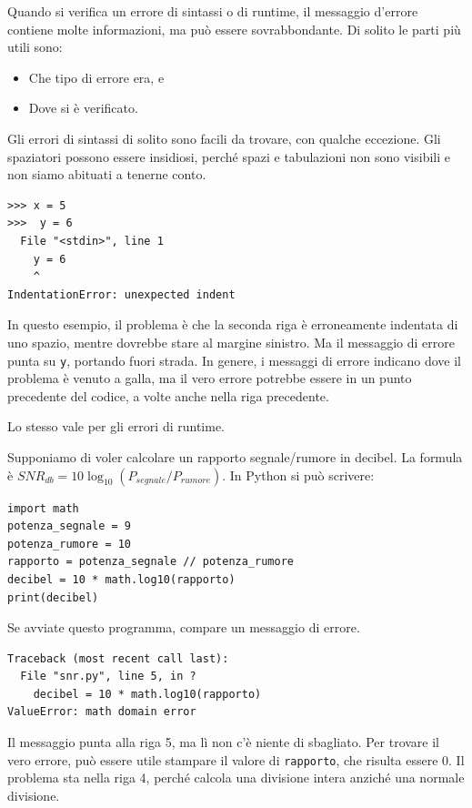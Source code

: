 \documentclass[10pt]{book}
\begin{document}
Quando si verifica un errore di sintassi o di runtime, il messaggio d'errore  contiene molte informazioni, ma può essere sovrabbondante. Di solito le parti più utili sono:

\begin{itemize}

\item Che tipo di errore era, e

\item Dove si è verificato.

\end{itemize}

Gli errori di sintassi di solito sono facili da trovare, con qualche eccezione. Gli spaziatori possono essere insidiosi, perché spazi e tabulazioni non sono visibili e non siamo abituati a tenerne conto.

\begin{verbatim}
>>> x = 5
>>>  y = 6
  File "<stdin>", line 1
    y = 6
    ^
IndentationError: unexpected indent
\end{verbatim}
%
In questo esempio, il problema è che la seconda riga è erroneamente indentata di uno spazio, mentre dovrebbe stare al margine sinistro. Ma il messaggio di errore punta su {\tt y}, portando fuori strada. In genere, i messaggi di errore indicano dove il problema è venuto a galla, ma il vero errore potrebbe essere in un punto precedente del codice, a volte anche nella riga precedente.


Lo stesso vale per gli errori di runtime. 

Supponiamo di voler calcolare un rapporto segnale/rumore in decibel. La formula è
 $SNR_{db} = 10 \log_{10} (P_{segnale} / P_{rumore})$. In Python si può scrivere:

\begin{verbatim}
import math
potenza_segnale = 9
potenza_rumore = 10
rapporto = potenza_segnale // potenza_rumore
decibel = 10 * math.log10(rapporto)
print(decibel)
\end{verbatim}
%
Se avviate questo programma, compare un messaggio di errore.

\begin{verbatim}
Traceback (most recent call last):
  File "snr.py", line 5, in ?
    decibel = 10 * math.log10(rapporto)
ValueError: math domain error
\end{verbatim}
%
Il messaggio punta alla riga 5, ma lì non c'è niente di sbagliato. Per trovare il vero errore, può essere utile stampare il valore di {\tt rapporto}, che risulta essere 0. Il problema sta nella riga 4, perché calcola una divisione intera anziché una normale divisione.
\end{document}
